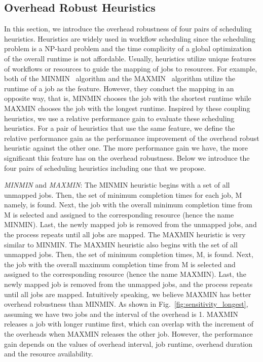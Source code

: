 \subsection{Overhead Robust Heuristics}
\label{sec:heuristics}
In this section, we introduce the overhead robustness of four pairs of scheduling heuristics. Heuristics are widely used in workflow scheduling since the scheduling problem is a NP-hard problem and the time complicity of a global optimization of the overall runtime is not affordable. Usually, heuristics utilize unique features of workflows or resources to guide the mapping of jobs to resources. For example, both of the MINMIN~\cite{Blythe2005} algorithm and the MAXMIN~\cite{Braun2001} algorithm utilize the runtime of a job as the feature. However, they conduct the mapping in an opposite way, that is, MINMIN chooses the job with the shortest runtime while MAXMIN chooses the job with the longest runtime. 
Inspired by these coupling heuristics, we use a relative performance gain to evaluate these scheduling heuristics. For a pair of heuristics that use the same feature, we define the relative performance gain as the performance improvement of the overhead robust heuristic against the other one. The more performance gain we have, the more significant this feature has on the overhead robustness. 
Below we introduce the four pairs of scheduling heuristics including one that we propose. 


\emph{MINMIN} and \emph{MAXMIN}: The MINMIN heuristic begins with a set of all unmapped jobs. Then, the set of minimum completion times for each job, M namely, is found. Next, the job with the overall minimum completion time from M is selected and assigned to the corresponding resource (hence the name MINMIN). Last, the newly mapped job is removed from the unmapped jobs, and the process repeats until all jobs are mapped. 
The MAXMIN heuristic is very similar to MINMIN. The MAXMIN heuristic also begins with the set of all unmapped jobs. Then, the set of minimum completion times, M, is found. Next, the job with the overall maximum completion time from M is selected and assigned to the corresponding resource (hence the name MAXMIN). Last, the newly mapped job is removed from the unmapped jobs, and the process repeats until all jobs are mapped. 
Intuitively speaking, we believe MAXMIN has better overhead robustness than MINMIN. As shown in Fig.~\ref{fig:sensitivity_longest}, assuming we have two jobs and the interval of the overhead is 1. MAXMIN releases a job with longer runtime first, which can overlap with the increment of the overheads when MAXMIN releases the other job. However, the performance gain depends on the values of overhead interval, job runtime, overhead duration and the resource availability. 

